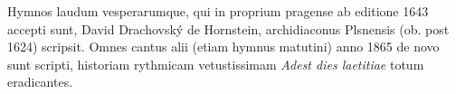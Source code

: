 Hymnos laudum vesperarumque, qui in proprium pragense ab editione
1643 accepti sunt, David Drachovský de Hornstein, archidiaconus Plsnensis
(ob. post 1624) scripsit.
Omnes cantus alii (etiam hymnus matutini) anno 1865 de novo sunt scripti,
historiam rythmicam vetustissimam \emph{Adest dies laetitiae}
totum eradicantes.
